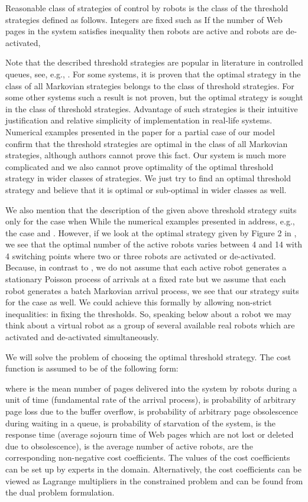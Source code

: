 \documentclass[11pt]{article}
\begin{document}
Reasonable class of strategies of control by robots is the class of
the threshold strategies defined as follows. Integers
 are fixed such as  If the number  of Web pages in the system
satisfies inequality  then  robots
are active and  robots are de-activated, 

Note that the described threshold strategies are popular in
literature in controlled queues, see, e.g., \cite{aod,c,d,dk,t}.
For some systems, it is proven that the optimal strategy in the
class of all Markovian strategies belongs to the class of threshold
strategies. For some other systems such a result is not proven, but
the optimal strategy is sought in the class of threshold strategies.
Advantage of such strategies is their intuitive justification and
relative simplicity of implementation in real-life systems.
Numerical examples presented in the paper \cite{tlnc} for a partial
case of our model confirm that the threshold strategies are optimal
in the class of all Markovian strategies, although authors cannot
prove this fact. Our system is much more complicated and we also 
cannot prove optimality of the optimal threshold strategy in wider
classes of strategies. We just try to find an optimal threshold
strategy and believe that it is optimal or sub-optimal in wider
classes as well.

We also mention that the description of the given above threshold strategy
suits only for the case when  While the numerical examples
presented in \cite{tlnc} address, e.g., the case  and .
However, if we look at the optimal strategy given by Figure 2 in
\cite{tlnc}, we see that the optimal number of the active robots
varies between 4 and 14 with 4 switching points where two or three
robots are activated or de-activated.  Because, in contrast to
\cite{tlnc}, we do not assume that each active robot generates a
stationary Poisson process of arrivals at a fixed rate but we assume
that each robot generates a batch Markovian arrival process,
we see that our strategy suits for the case  as well. We could achieve this formally by allowing non-strict inequalities:
  in fixing the
 thresholds.
 So, speaking below about a robot we may think about a virtual robot
 as a group of several
 available real robots which are activated and de-activated
 simultaneously.

We will solve the problem of choosing the optimal threshold
strategy. The cost function is assumed to be of the following form:

where  is the mean number of pages delivered into the
system by robots during a unit of time (fundamental rate of the
arrival process),  is probability of arbitrary page loss
due to the buffer overflow,  is probability of arbitrary
page obsolescence during waiting in a queue,  is
probability of starvation of the system,   is the
response time (average sojourn time of Web pages which are not lost
or deleted due to obsolescence),  is the average number 
of active robots,  are the
corresponding non-negative cost coefficients. The values of the cost
coefficients can be set up by experts in the domain. Alternatively,
the cost coefficients can be viewed as Lagrange multipliers in the
constrained problem and can be found from the dual problem 
formulation.
\end{document}
